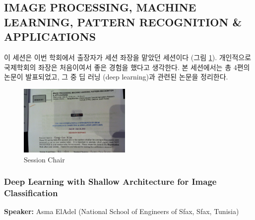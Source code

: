 \documentclass[twocolumn]{article}
\begin{document}
%
%
%

\subsection{IMAGE PROCESSING, MACHINE LEARNING, PATTERN RECOGNITION \& APPLICATIONS}

이 세션은 이번 학회에서 출장자가 세션 좌장을 맡았던 세션이다 (그림 \ref{fig:chair}). 개인적으로 국제학회의 좌장은 처음이여서 좋은 경험을 했다고 생각한다. 본 세션에서는 총 4편의 논문이 발표되었고, 그 중 딥 러닝 (deep learning)과 관련된 논문을 정리한다.

\begin{figure}[htb]
        \centering
        \includegraphics[width=0.48\textwidth]{chair.png}
        \caption{Session Chair}
        \label{fig:chair}
\end{figure}

%
%
%
%

\subsubsection{Deep Learning with Shallow Architecture for Image Classification}
\textbf{Speaker:} Asma ElAdel (National School of Engineers of Sfax, Sfax, Tunisia)
\end{document}
